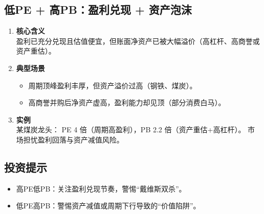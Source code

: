 \subsection{低PE + 高PB：盈利兑现 + 资产泡沫}
\begin{enumerate}[leftmargin=*, nosep]
    \item \textbf{核心含义}  \\
    盈利已充分兑现且估值便宜，但账面净资产已被大幅溢价（高杠杆、高商誉或资产重估）。
    
    \item \textbf{典型场景}  
    \begin{itemize}[nosep]  
        \item 周期顶峰盈利丰厚，但资产溢价过高（钢铁、煤炭）。  
        \item 高商誉并购后净资产虚高，盈利能力却见顶（部分消费白马）。  
    \end{itemize}
    
    \item \textbf{实例}  \\
    某煤炭龙头：  
    PE 4 倍（周期高盈利），PB 2.2 倍（资产重估+高杠杆）。  
    市场担忧盈利回落与资产减值风险。
\end{enumerate}

\subsection{投资提示}
\begin{itemize}[leftmargin=*, nosep]
    \item 高PE低PB：关注盈利兑现节奏，警惕{\color{red}“戴维斯双杀”}。  
    \item 低PE高PB：警惕资产减值或周期下行导致的{\color{red}“价值陷阱”}。  
\end{itemize}

\clearpage


